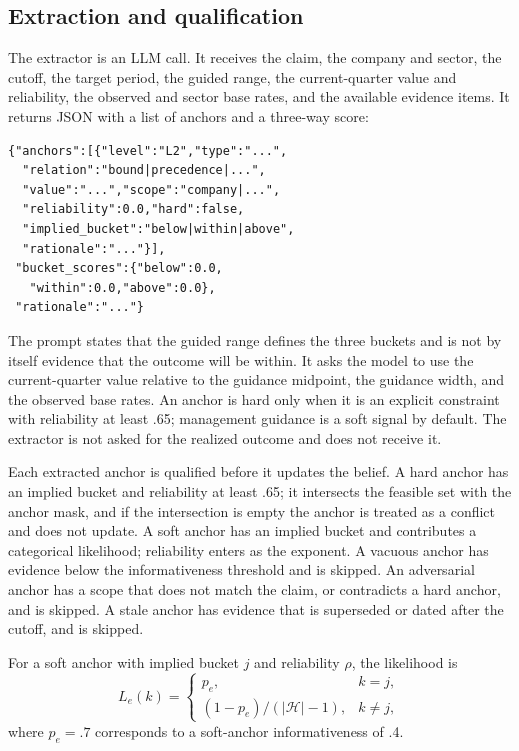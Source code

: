\documentclass[11pt]{article}
\begin{document}
\subsection{Extraction and qualification}
The extractor is an LLM call. It receives the claim, the company and sector, the cutoff, the target period, the guided range, the current-quarter value and reliability, the observed and sector base rates, and the available evidence items. It returns JSON with a list of anchors and a three-way score:
{\scriptsize
\begin{verbatim}
{"anchors":[{"level":"L2","type":"...",
  "relation":"bound|precedence|...",
  "value":"...","scope":"company|...",
  "reliability":0.0,"hard":false,
  "implied_bucket":"below|within|above",
  "rationale":"..."}],
 "bucket_scores":{"below":0.0,
   "within":0.0,"above":0.0},
 "rationale":"..."}
\end{verbatim}}
The prompt states that the guided range defines the three buckets and is not by itself evidence that the outcome will be within. It asks the model to use the current-quarter value relative to the guidance midpoint, the guidance width, and the observed base rates. An anchor is hard only when it is an explicit constraint with reliability at least .65; management guidance is a soft signal by default. The extractor is not asked for the realized outcome and does not receive it.

Each extracted anchor is qualified before it updates the belief. A hard anchor has an implied bucket and reliability at least .65; it intersects the feasible set with the anchor mask, and if the intersection is empty the anchor is treated as a conflict and does not update. A soft anchor has an implied bucket and contributes a categorical likelihood; reliability enters as the exponent. A vacuous anchor has evidence below the informativeness threshold and is skipped. An adversarial anchor has a scope that does not match the claim, or contradicts a hard anchor, and is skipped. A stale anchor has evidence that is superseded or dated after the cutoff, and is skipped.

For a soft anchor with implied bucket $j$ and reliability $\rho$, the likelihood is
\begin{equation}
L_e(k)=
\begin{cases}
p_e, & k=j,\\
(1-p_e)/(|\mathcal H|-1), & k\ne j,
\end{cases}
\end{equation}
where $p_e=.7$ corresponds to a soft-anchor informativeness of .4.
\end{document}
